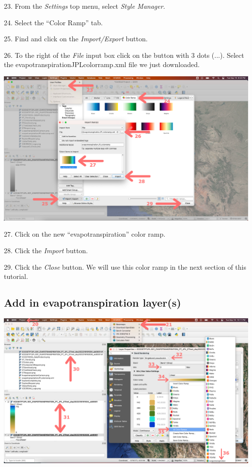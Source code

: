 \documentclass[oneside,a4paper,11pt,explicit]{book}
\begin{document}
23. From the \textit{Settings} top menu, select \textit{Style Manager}.

24. Select the ``Color Ramp'' tab.

25. Find and click on the \textit{Import/Export} button.

26. To the right of the \textit{File} input box click on the button with 3 dots (...). Select the evapotranspirationJPLcolorramp.xml file we just downloaded.

\centerline{\includegraphics[width=\textwidth]{ImportColorramp.png}} 

27. Click on the new ``evapotranspiration'' color ramp.

28. Click the \textit{Import} button.

29. Click the \textit{Close} button. We will use this color ramp in the next section of this tutorial.

\subsection{Add in evapotranspiration layer(s)}

\centerline{\includegraphics[width=\textwidth]{ETmapping.png}}
\end{document}
